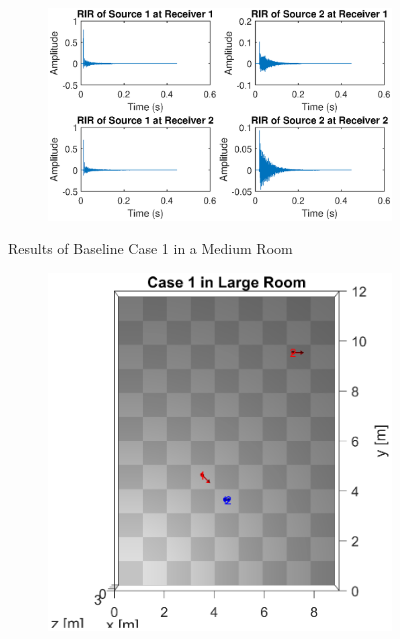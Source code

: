 \documentclass[a4paper,twoside,12pt,hidelinks]{article}
\begin{document}
\begin{appendices}
\begin{figure}[H]
\begin{subfigure}[H]{0.55\textwidth}
\includegraphics[width=\textwidth]{1m_ir}
\end{subfigure}
\caption{Results of Baseline Case 1 in a Medium Room}
\end{figure}
\vspace*{-0.5cm}
\begin{figure}[H]
\centering
\begin{subfigure}[H]{0.3\textwidth}
\includegraphics[width=\textwidth]{1l_lo}
\end{subfigure}
\begin{subfigure}[H]{0.55\textwidth}

\end{subfigure}
\end{figure}
\end{appendices}
\end{document}
